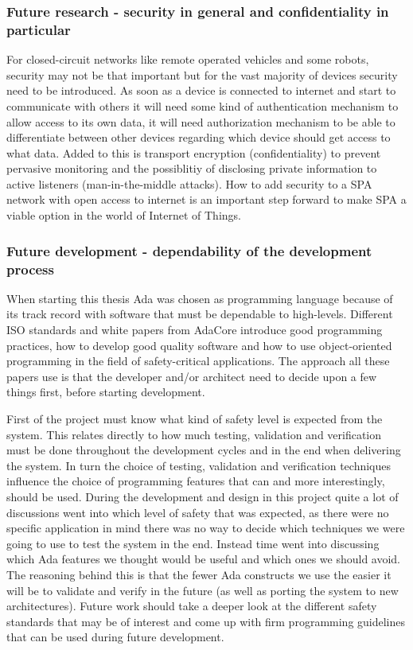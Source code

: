 \subsubsection{Future research - security in general and confidentiality in
particular}
For closed-circuit networks like remote operated vehicles and some robots,
security may not be that important but for the vast majority of devices
security need to be introduced. As soon as a device is connected to internet
and start to communicate with others it will need some kind of authentication
mechanism to allow access to its own data, it will need authorization mechanism
to be able to differentiate between other devices regarding which
device should get access to what data. Added to this is transport encryption
(confidentiality) to prevent pervasive monitoring and the possiblitiy of
disclosing private information to active listeners (man-in-the-middle attacks).
How to add security to a SPA network with open access to internet is an
important step forward to make SPA a viable option in the world of Internet of
Things.

\subsubsection{Future development - dependability of the development process}
When starting this thesis Ada was chosen as programming language because of its
track record with software that must be dependable to high-levels. Different
ISO standards and white papers from AdaCore introduce good programming
practices, how to develop good quality software and how to use object-oriented
programming in the field of safety-critical applications. The approach all
these papers use is that the developer and/or architect need to decide upon a
few things first, before starting development.

First of the project must know what kind of safety level is expected from the
system. This relates directly to how much testing, validation and verification
must be done throughout the development cycles and in the end when delivering
the system. In turn the choice of testing, validation and verification
techniques influence the choice of programming features that can and more
interestingly, should be used. During the development and design in this
project quite a lot of discussions went into which level of safety that was
expected, as there were no specific application in mind there was no way to
decide which techniques we were going to use to test the system in the end.
Instead time went into discussing which Ada features we thought would be useful
and which ones we should avoid. The reasoning behind this is that the fewer Ada
constructs we use the easier it will be to validate and verify in the future
(as well as porting the system to new architectures). Future work should take a
deeper look at the different safety standards that may be of interest and come
up with firm programming guidelines that can be used during future development.

